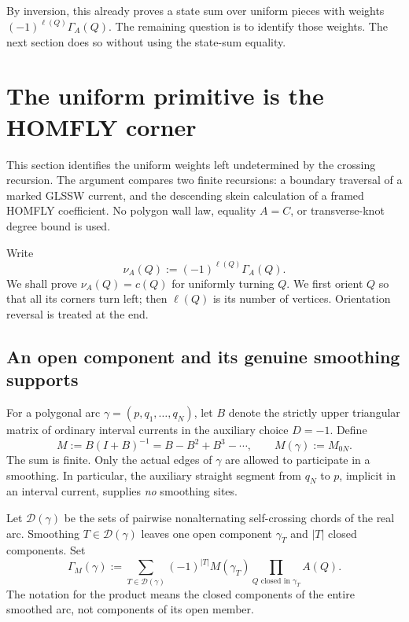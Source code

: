 \documentclass[11pt,letterpaper]{article}
\numberwithin{equation}{section}
\theoremstyle{definition}
\theoremstyle{remark}
\begin{document}
By inversion, this already proves a state sum over uniform pieces with
weights \((-1)^{\ell(Q)}\Gamma_A(Q)\). The remaining question is to
identify those weights. The next section does so without using the
state-sum equality.


\section{The uniform primitive is the HOMFLY corner}
\label{un:section}

This section identifies the uniform weights left undetermined by the
crossing recursion.  The argument compares two finite recursions: a
boundary traversal of a marked GLSSW current, and the descending skein
calculation of a framed HOMFLY coefficient.  No polygon wall law, equality
$A=C$, or transverse-knot degree bound is used.

Write
\begin{equation}
 \nu_A(Q):=(-1)^{\ell(Q)}\Gamma_A(Q).
 \label{un:nu}
\end{equation}
We shall prove $\nu_A(Q)=c(Q)$ for uniformly turning $Q$.  We first orient
$Q$ so that all its corners turn left; then $\ell(Q)$ is its number of
vertices.  Orientation reversal is treated at the end.

\subsection{An open component and its genuine smoothing supports}
\label{un:open}

For a polygonal arc $\gamma=(p,q_1,\ldots,q_N)$, let $B$ denote the
strictly upper triangular matrix of ordinary interval currents in the
auxiliary choice $D=-1$.  Define
\begin{equation}
 M:=B(I+B)^{-1}=B-B^2+B^3-\cdots,
 \qquad M(\gamma):=M_{0N}.
 \label{un:M}
\end{equation}
The sum is finite.  Only the actual edges of $\gamma$ are allowed to
participate in a smoothing.  In particular, the auxiliary straight
segment from $q_N$ to $p$, implicit in an interval current, supplies
\emph{no} smoothing sites.

Let $\mathcal D(\gamma)$ be the sets of pairwise nonalternating
self-crossing chords of the real arc.  Smoothing $T\in\mathcal D(\gamma)$
leaves one open component $\gamma_T$ and $|T|$ closed components.  Set
\begin{equation}
 \Gamma_M(\gamma):=
 \sum_{T\in\mathcal D(\gamma)}(-1)^{|T|}
 M(\gamma_T)\prod_{Q\text{ closed in }\gamma_T}A(Q).
 \label{un:GammaM}
\end{equation}
The notation for the product means the closed components of the entire
smoothed arc, not components of its open member.
\end{document}
